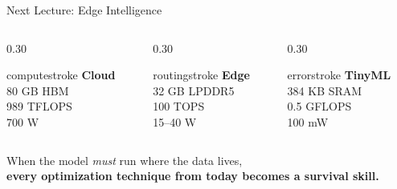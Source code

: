 \documentclass[aspectratio=169, 12pt]{beamer}
\begin{document}
\begin{frame}{Next Lecture: Edge Intelligence}

\footnotesize
\begin{columns}[c]
  \begin{column}{0.30\textwidth}
    \centering
    \begin{mlsyscard}{computestroke}
    {\large\bfseries Cloud}\\[0.1cm]
    {\footnotesize 80 GB HBM\\989 TFLOPS\\700 W}
    \end{mlsyscard}
  \end{column}
  \begin{column}{0.30\textwidth}
    \centering
    \begin{mlsyscard}{routingstroke}
    {\large\bfseries Edge}\\[0.1cm]
    {\footnotesize 32 GB LPDDR5\\100 TOPS\\15--40 W}
    \end{mlsyscard}
  \end{column}
  \begin{column}{0.30\textwidth}
    \centering
    \begin{mlsyscard}{errorstroke}
    {\large\bfseries TinyML}\\[0.1cm]
    {\footnotesize 384 KB SRAM\\0.5 GFLOPS\\100 mW}
    \end{mlsyscard}
  \end{column}
\end{columns}

\vspace{0.3cm}
\centering
{\normalsize When the model \emph{must} run where the data lives,}\\[0.1cm]
{\small\textbf{every optimization technique from today becomes a survival skill.}}

\end{frame}
\end{document}

